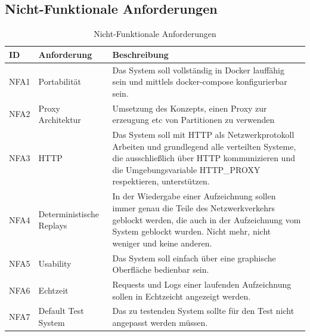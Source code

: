 \documentclass[12pt,a4paper]{report}
\begin{document}
\subsection{Nicht-Funktionale Anforderungen}
\begin{table}[H]
	\centering
	\caption{Nicht-Funktionale Anforderungen}
	\label{tab:nfa}
	\begin{tabular}{|l|l|p{7cm}|}
		\hline
		ID   & Anforderung              & Beschreibung                                                                                                                                                                                                  \\ \hline
		NFA1 & Portabilität             & Das System soll vollständig in Docker lauffähig sein und mittlels docker-compose konfigurierbar sein.                                                                                                         \\ \hline
		NFA2 & Proxy Architektur        & Umsetzung des Konzepts, einen Proxy zur erzeugung etc von Partitionen zu verwenden                                                                                                                            \\ \hline
		NFA3 & HTTP                     & Das System soll mit HTTP als Netzwerkprotokoll Arbeiten und grundlegend alle verteilten Systeme, die ausschließlich über HTTP kommunizieren und die Umgebungsvariable HTTP\_PROXY respektieren, unterstützen. \\ \hline
		NFA4 & Deterministische Replays & In der Wiedergabe einer Aufzeichnung sollen immer genau die Teile des Netzwerkverkehrs geblockt werden, die auch in der Aufzeichnung vom System geblockt wurden. Nicht mehr, nicht weniger und keine anderen. \\ \hline
		NFA5 & Usability                & Das System soll einfach über eine graphische Oberfläche bedienbar sein.                                                                                                                                       \\ \hline
		NFA6 & Echtzeit                 & Requests und Logs einer laufenden Aufzeichnung sollen in Echtzeicht angezeigt werden.                                                                                                                         \\ \hline
		NFA7 & Default Test System      & Das zu testenden System sollte für den Test nicht angepasst werden müssen.                                                                                                                                    \\ \hline
	\end{tabular}
\end{table}
\end{document}
